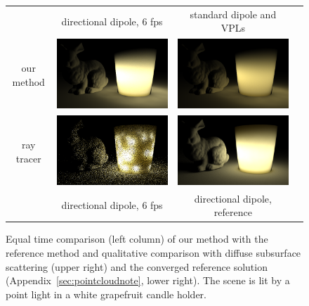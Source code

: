%
\begin{figure}[t]
\centering
\begin{tabular}{@{}c@{$\,$}c@{}c@{}c@{}}
& directional dipole, 6 fps & standard dipole and VPLs \\
\begin{sideways}\hspace*{1.5em}our method\end{sideways}\hspace{0.5mm} &
\includegraphics[width=0.43\columnwidth]{figures/candle_holder_directional_6fps.png} &
\includegraphics[width=0.43\columnwidth]{figures/candle_holder_jensen_converged.png} \\[-4pt]
\begin{sideways}\hspace*{1.7em}ray tracer\end{sideways}\hspace{0.5mm} &
\includegraphics[width=0.43\columnwidth]{figures/scene_comparison_optix_6fps.png} &
\includegraphics[width=0.43\columnwidth]{figures/scene_comparison_converged.png} \\[-0.5ex]
& directional dipole, 6 fps & directional dipole, reference \\[-1ex]
\end{tabular}
\caption{Equal time comparison (left column) of our method with the reference method and qualitative comparison with diffuse subsurface scattering (upper right) and the converged reference solution (Appendix~\ref{sec:pointcloudnote}, lower right). The scene is lit by a point light in a white grapefruit candle holder.} %
\label{fig:optixcomparison}
\end{figure}

